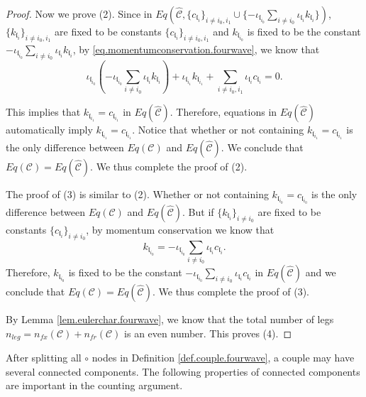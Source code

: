 \begin{proof}
Now we prove (2). Since in $Eq\left(\widehat{\mathcal{C}}, \{c_{\mathfrak{l}_{i}}\}_{i\ne i_0, i_1}\cup \{-\iota_{\mathfrak{l}_{i_0}}\sum_{i\ne i_0} \iota_{\mathfrak{l}_i}k_{\mathfrak{l}_i}\}\right)$, $\{k_{\mathfrak{l}_{i}}\}_{i\ne i_0, i_1}$ are fixed to be constants $\{c_{\mathfrak{l}_{i}}\}_{i\ne i_0, i_1}$ and $k_{\mathfrak{l}_{i_0}}$ is fixed to be the constant $-\iota_{\mathfrak{l}_{i_0}}\sum_{i\ne i_0} \iota_{\mathfrak{l}_i}k_{\mathfrak{l}_i}$, by \eqref{eq.momentumconservation.fourwave}, we know that 
\begin{equation}
 \iota_{\mathfrak{l}_{i_0}}\left(-\iota_{\mathfrak{l}_{i_0}}\sum_{i\ne i_0} \iota_{\mathfrak{l}_i}k_{\mathfrak{l}_i}\right)+ \iota_{\mathfrak{l}_{i_1}}k_{\mathfrak{l}_{i_1}}+\sum_{i\ne i_0, i_1} \iota_{\mathfrak{l}_i}c_{\mathfrak{l}_i}=0.
\end{equation}

This implies that $k_{\mathfrak{l}_{i_1}}=c_{\mathfrak{l}_{i_1}}$ in $Eq(\widehat{\mathcal{C}})$. Therefore, equations in $Eq(\widehat{\mathcal{C}})$ automatically imply $k_{\mathfrak{l}_{i_1}}=c_{\mathfrak{l}_{i_1}}$. Notice that whether or not containing $k_{\mathfrak{l}_{i_1}}=c_{\mathfrak{l}_{i_1}}$ is the only difference between $Eq(\mathcal{C})$ and $Eq(\widehat{\mathcal{C}})$. We conclude that $Eq(\mathcal{C})=Eq(\widehat{\mathcal{C}})$. We thus complete the proof of (2).

The proof of (3) is similar to (2). Whether or not containing $k_{\mathfrak{l}_{i_0}}=c_{\mathfrak{l}_{i_0}}$ is the only difference between $Eq(\mathcal{C})$ and $Eq(\widehat{\mathcal{C}})$. But if $\{k_{\mathfrak{l}_{i}}\}_{i\ne i_0}$ are fixed to be constants $\{c_{\mathfrak{l}_{i}}\}_{i\ne i_0}$, by momentum conservation we know that 
\begin{equation}
 k_{\mathfrak{l}_{i_0}}=-\iota_{\mathfrak{l}_{i_0}}\sum_{i\ne i_0} \iota_{\mathfrak{l}_i}c_{\mathfrak{l}_i}.
\end{equation}
Therefore, $k_{\mathfrak{l}_{i_0}}$ is fixed to be the constant $-\iota_{\mathfrak{l}_{i_0}}\sum_{i\ne i_0} \iota_{\mathfrak{l}_i}c_{\mathfrak{l}_i}$ in $Eq(\widehat{\mathcal{C}})$ and we conclude that $Eq(\mathcal{C})=Eq(\widehat{\mathcal{C}})$. We thus complete the proof of (3).

By Lemma \ref{lem.eulerchar.fourwave}, we know that the total number of legs $n_{leg} = n_{fx}(\mathcal{C})+n_{\textit{fr}}(\mathcal{C})$ is an even number. This proves (4).
\end{proof}

After splitting all $\circ$ nodes in Definition \ref{def.couple.fourwave}, a couple may have several connected components. The following properties of connected components are important in the counting argument.

